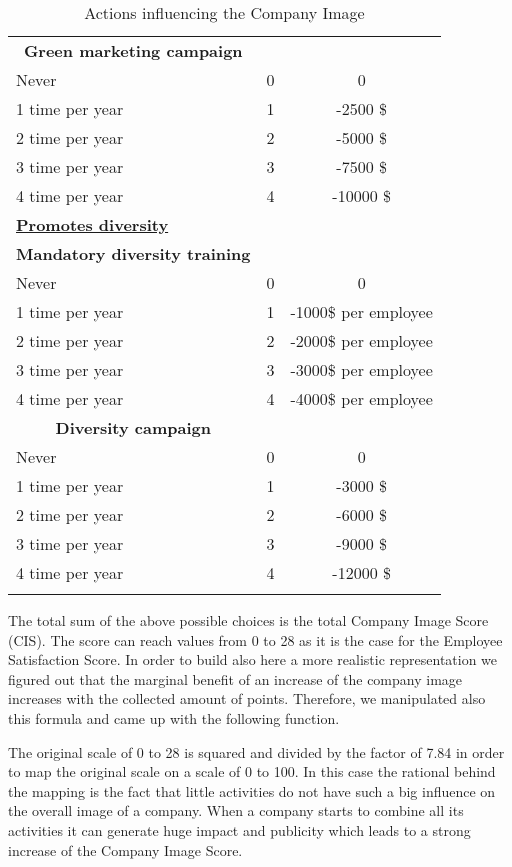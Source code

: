 \begin{longtable}[]{l|c|c}
     \multicolumn{1}{c|}{\textbf{Green marketing campaign}} & & \\
     Never & 0 & 0 \\
     1 time per year & 1 & -2500 \$  \\
     2 time per year & 2 & -5000 \$  \\
     3 time per year & 3 & -7500 \$  \\
     4 time per year & 4 & -10000 \$  \\
     \hline \hline
     \underline{\textbf{Promotes diversity}} & & \\ [1ex]
     \multicolumn{1}{c|}{\textbf{Mandatory diversity training}} & & \\
     Never & 0 & 0 \\
     1 time per year & 1 & -1000\$ per employee  \\
     2 time per year & 2 & -2000\$ per employee  \\
     3 time per year & 3 & -3000\$ per employee  \\
     4 time per year & 4 & -4000\$ per employee  \\
     \multicolumn{1}{c|}{\textbf{Diversity campaign}} & & \\
     Never & 0 & 0 \\
     1 time per year & 1 & -3000 \$  \\
     2 time per year & 2 & -6000 \$  \\
     3 time per year & 3 & -9000 \$  \\
     4 time per year & 4 & -12000 \$  \\
     \hline 
\caption{Actions influencing the Company Image}
    \label{tab:benefitsCIS}
\end{longtable}

The total sum of the above possible choices is the total Company Image Score (CIS). The score can reach values from 0 to 28 as it is the case for the Employee Satisfaction Score. In order to build also here a more realistic representation we figured out that the marginal benefit of an increase of the company image increases with the collected amount of points. Therefore, we manipulated also this formula and came up with the following function.


The original scale of 0 to 28 is squared and divided by the factor of 7.84 in order to map the original scale on a scale of 0 to 100. In this case the rational behind the mapping is the fact that little activities do not have such  a big influence on the overall image of a company. When a company starts to combine all its activities it can generate huge impact and publicity which leads to a strong increase of the Company Image Score.